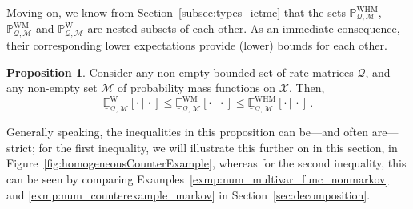 \documentclass[10pt,a4paper]{paper}
\theoremstyle{definition}
\newtheorem{proposition}[theorem]{Proposition}
\newcommand{\states}{\mathcal{X}}
\newcommand{\processes}{\mathbb{P}}
\newcommand{\wprocesses}{\processes^{\mathrm{W}}}
\newcommand{\wmprocesses}{\processes^{\mathrm{WM}}}
\newcommand{\whmprocesses}{\processes^{\mathrm{WHM}}}
\newcommand{\rateset}{\mathcal{Q}}
\begin{document}
Moving on, we know from Section~\ref{subsec:types_ictmc} that the sets $\whmprocesses_{\rateset,\mathcal{M}}$, $\wmprocesses_{\rateset,\mathcal{M}}$ and $\wprocesses_{\rateset,\mathcal{M}}$ are nested subsets of each other. As an immediate consequence, their corresponding lower expectations provide (lower) bounds for each other.
\begin{proposition}\label{prop:lower_exp_markov_bounded_by_nonmarkov}
Consider any non-empty bounded set of rate matrices $\rateset$, and any non-empty set $\mathcal{M}$ of probability mass functions on $\states$. Then,
\begin{equation*}
\underline{\mathbb{E}}_{\rateset,\mathcal{M}}^\mathrm{W}[\cdot\,\vert\,\cdot] \leq
\underline{\mathbb{E}}_{\rateset,\mathcal{M}}^\mathrm{WM}[\cdot\,\vert\,\cdot] \leq
\underline{\mathbb{E}}_{\rateset,\mathcal{M}}^\mathrm{WHM}[\cdot\,\vert\,\cdot]\,.
\end{equation*}
\end{proposition}

Generally speaking, the inequalities in this proposition can be---and often are---strict; for the first inequality, we will illustrate this further on in this section, in Figure~\ref{fig:homogeneousCounterExample}, whereas for the second inequality, this can be seen by comparing Examples~\ref{exmp:num_multivar_func_nonmarkov} and \ref{exmp:num_counterexample_markov} in Section~\ref{sec:decomposition}.





\end{document}
